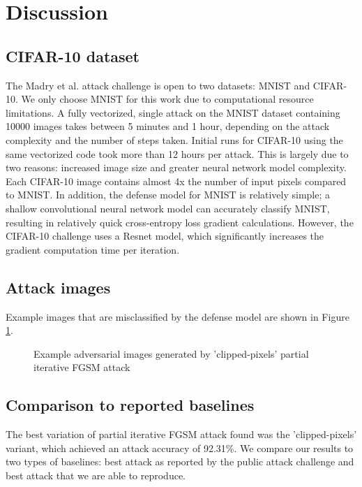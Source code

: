 \section{Discussion}
\subsection{CIFAR-10 dataset}
The Madry et al. attack challenge is open to two datasets: MNIST and CIFAR-10. We only choose MNIST for this work due to computational resource limitations. A fully vectorized, single attack on the MNIST dataset containing 10000 images takes between 5 minutes and 1 hour, depending on the attack complexity and the number of steps taken. Initial runs for CIFAR-10 using the same vectorized code took more than 12 hours per attack. This is largely due to two reasons: increased image size and greater neural network model complexity. Each CIFAR-10 image contains almost 4x the number of input pixels compared to MNIST. In addition, the defense model for MNIST is relatively simple; a shallow convolutional neural network model can accurately classify MNIST, resulting in relatively quick cross-entropy loss gradient calculations. However, the CIFAR-10 challenge uses a Resnet model, which significantly increases the gradient computation time per iteration.

\subsection{Attack images}
Example images that are misclassified by the defense model are shown in Figure \ref{fig:adv_example_images}. 


\begin{figure}
    \centering
    \caption{Example adversarial images generated by 'clipped-pixels' partial iterative FGSM attack}
    \label{fig:adv_example_images}
\end{figure}

\subsection{Comparison to reported baselines}
The best variation of partial iterative FGSM attack found was the 'clipped-pixels' variant, which achieved an attack accuracy of 92.31\%. We compare our results to two types of baselines: best attack as reported by the public attack challenge and best attack that we are able to reproduce.

